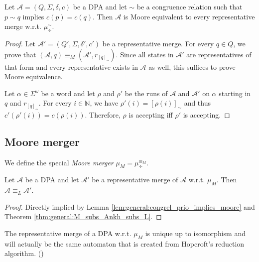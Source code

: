\begin{lem}
\label{lem:general:congrel_prio_implies_moore}
	Let $\mathcal{A} = (Q, \Sigma, \delta, c)$ be a DPA and let $\sim$ be a congruence relation such that $p \sim q$ implies $c(p) = c(q)$. Then $\mathcal{A}$ is Moore equivalent to every representative merge w.r.t. $\mu_\div^\sim$.
\end{lem} 

\begin{proof} 
	Let $\mathcal{A}' = (Q', \Sigma, \delta', c')$ be a representative merge. For every $q \in Q$, we prove that $(\mathcal{A}, q) \equiv_M (\mathcal{A}', r_{[q]_\sim})$. Since all states in $\mathcal{A}'$ are representatives of that form and every representative exists in $\mathcal{A}$ as well, this suffices to prove Moore equivalence.
	
	Let $\alpha \in \Sigma^\omega$ be a word and let $\rho$ and $\rho'$ be the runs of $\mathcal{A}$ and $\mathcal{A}'$ on $\alpha$ starting in $q$ and $r_{[q]_\sim}$. For every $i \in \mathbb{N}$, we have $\rho'(i) = [\rho(i)]_\sim$ and thus $c'(\rho'(i)) = c(\rho(i))$. Therefore, $\rho$ is accepting iff $\rho'$ is accepting.
\end{proof}



\subsection{Moore merger}
\begin{defn}
	We define the special \emph{Moore merger} $\mu_M = \mu_\div^{\equiv_M}$.
\end{defn}

\begin{lem}
	Let $\mathcal{A}$ be a DPA and let $\mathcal{A}'$ be a representative merge of $\mathcal{A}$ w.r.t. $\mu_M$. Then $\mathcal{A} \equiv_L \mathcal{A}'$.
\end{lem}

\begin{proof}
	Directly implied by Lemma \ref{lem:general:congrel_prio_implies_moore} and Theorem \ref{thm:general:M_subs_Ankh_subs_L}.
\end{proof}

The representative merge of a DPA w.r.t. $\mu_M$ is unique up to isomorphism and will actually be the same automaton that is created from Hopcroft's reduction algorithm. (\cite{Hopcroft1971})

\vspace{5pt}

